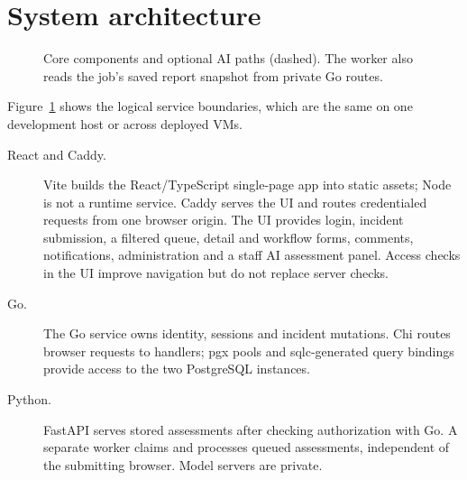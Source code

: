 \documentclass[11pt,a4paper]{article}
\newcommand{\code}[1]{\texttt{#1}}
\begin{document}
\section{System architecture}

\begin{figure}[htbp]
\centering
{}
\caption{Core components and optional AI paths (dashed). The worker also reads
the job's saved report snapshot from private Go routes.}
\label{fig:architecture}
\end{figure}

Figure~\ref{fig:architecture} shows the logical service boundaries, which
are the same on one development host or across deployed VMs.

\begin{description}
  \item[React and Caddy.] Vite builds the React/TypeScript single-page app
    into static assets; Node is not a runtime service. Caddy serves the UI
    and routes credentialed requests from one browser origin. The UI provides
    login, incident submission, a filtered queue, detail and workflow forms,
    comments, notifications, administration and a staff AI assessment panel.
    Access checks in the UI improve navigation but do not replace server checks.
  \item[Go.] The Go service owns identity, sessions and incident mutations.
    Chi routes browser requests to handlers; pgx pools and sqlc-generated
    query bindings provide access to the two PostgreSQL instances.
  \item[Python.] FastAPI serves stored assessments after checking authorization
    with Go. A separate worker claims and processes queued assessments,
    independent of the submitting browser. Model servers are private.
\end{description}
\end{document}
